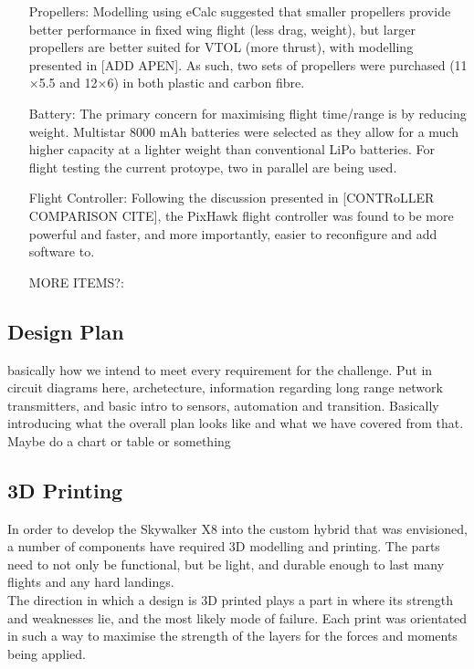 \begin{itemize}
		\item[Propellers:] Modelling using eCalc suggested that smaller propellers provide better performance in fixed wing flight (less drag, weight), but larger propellers are better suited for VTOL (more thrust), with modelling presented in [ADD APEN]. As such, two sets of propellers were purchased (11$\times$5.5 and 12$\times$6) in both plastic and carbon fibre.
	
		\item[Battery:] The primary concern for maximising flight time/range is by reducing weight. Multistar 8000 mAh batteries were selected as they allow for a much higher capacity at a lighter weight than conventional LiPo batteries. For flight testing the current protoype, two in parallel are being used. 
	
		\item[Flight Controller:] Following the discussion presented in [CONTRoLLER COMPARISON CITE], the PixHawk flight controller was found to be more powerful and faster, and more importantly, easier to reconfigure and add software to.
		
		\item[MORE ITEMS?:]
	\end{itemize}
\subsection{Design Plan}
\color{red}
basically how we intend to meet every requirement for the challenge. Put in circuit diagrams here, archetecture, information regarding long range network transmitters, and basic intro to sensors, automation and transition. Basically introducing what the overall plan looks like and what we have covered from that. Maybe do a chart or table or something
\color{black}
\subsection{3D Printing}
In order to develop the Skywalker X8 into the custom hybrid that was envisioned, a number of components have required 3D modelling and printing. The parts need to not only be functional, but be light, and durable enough to last many flights and any hard landings.\\

The direction in which a design is 3D printed plays a part in where its strength and weaknesses lie, and the most likely mode of failure. Each print was orientated in such a way to maximise the strength of the layers for the forces and moments being applied.\\

